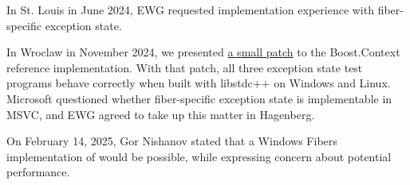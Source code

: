 In St. Louis in June 2024, EWG requested\cite{stlouisnotes} implementation
experience with fiber-specific exception state.

In Wroclaw in November 2024,\cite{wroclawnotes} we presented
\href{https://github.com/secondlife/3p-boost/blob/nat/exstate/patches/libs/context/0001-switch-exception-state.patch}{a small patch}
to the Boost.Context reference implementation. With that patch, all three
exception state test programs behave correctly when built with libstdc++ on
Windows and Linux. Microsoft questioned whether fiber-specific exception state
is implementable in MSVC, and EWG agreed to take up this matter in Hagenberg.

On February 14, 2025, Gor Nishanov stated\cite{onwindows} that a Windows
Fibers implementation of \fiber would be possible, while expressing concern
about potential performance.


